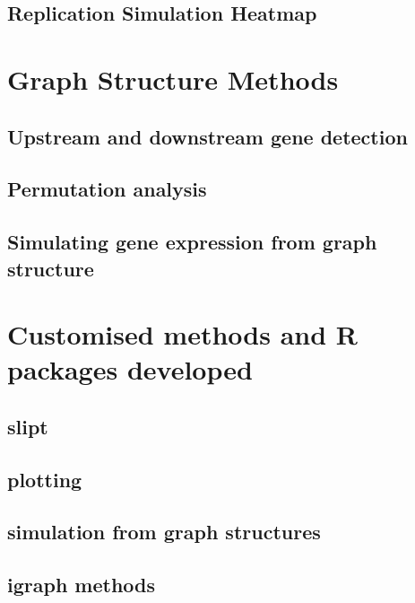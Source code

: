 \subsection{Replication Simulation Heatmap}
\section{Graph Structure Methods}
\subsection{Upstream and downstream gene detection}
\subsection{Permutation analysis}
\subsection{Simulating gene expression from graph structure}
\section{Customised methods and R packages developed}
\subsection{slipt}
\subsection{plotting}
\subsection{simulation from graph structures}
\subsection{igraph methods}